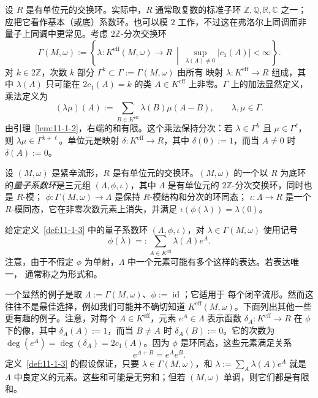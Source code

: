 设 $R$ 是有单位元的交换环。实际中，$R$ 通常取复数的标准子环
$\mathbb Z,\mathbb Q,\mathbb R,\mathbb C$ 之一；应把它看作基本（或底）系数环。也可以模
$2$ 工作，不过这在弗洛尔上同调而非量子上同调中更常见。考虑 $2\mathbb Z$-分次交换环
\[
  \Gamma(M,\omega):=
  \left\{\lambda:K^{\mathrm{eff}}(M,\omega)\to R\ \middle|\
  \sup_{\lambda(A)\ne0}|c_1(A)|<\infty\right\}.
\]
对 $k\in2\mathbb Z$，次数 $k$ 部分 $\Gamma^k\subset\Gamma:=\Gamma(M,\omega)$ 由所有
映射 $\lambda:K^{\mathrm{eff}}\to R$ 组成，其中 $\lambda(A)$ 只可能在
$2c_1(A)=k$ 的类 $A\in K^{\mathrm{eff}}$ 上非零。$\Gamma$ 上的加法显然定义，乘法定义为
\[
  (\lambda\mu)(A):=\sum_{B\in K^{\mathrm{eff}}}\lambda(B)\mu(A-B),
  \qquad \lambda,\mu\in\Gamma.
\]
由引理~\ref{lem:11-1-2}，右端的和有限。这个乘法保持分次：若
$\lambda\in\Gamma^k$ 且 $\mu\in\Gamma^\ell$，则
$\lambda\mu\in\Gamma^{k+\ell}$。单位元是映射 $\delta:K^{\mathrm{eff}}\to R$，其中
$\delta(0):=1$，而当 $A\ne0$ 时 $\delta(A):=0$。

\begin{definition}\label{def:11-1-3}
设 $(M,\omega)$ 是紧辛流形，$R$ 是有单位元的交换环。$(M,\omega)$ 的一个以 $R$ 为底环
的\emph{\BookRecordIndex{T0231}量子系数环}是三元组 $(\Lambda,\phi,\iota)$，其中 $\Lambda$ 是有单位元的
$2\mathbb Z$-分次交换环，同时也是 $R$-模；
$\phi:\Gamma(M,\omega)\to\Lambda$ 是保持 $R$-模结构和分次的环同态；
$\iota:\Lambda\to R$ 是一个 $R$-模同态，它在非零次数元素上消失，并满足
$\iota(\phi(\lambda))=\lambda(0)$。
\end{definition}

给定定义~\ref{def:11-1-3} 中的量子系数环 $(\Lambda,\phi,\iota)$，对
$\lambda\in\Gamma(M,\omega)$ 使用记号
\[
  \phi(\lambda)=:\sum_{A\in K^{\mathrm{eff}}}\lambda(A)e^A.
\]
注意，由于不假定 $\phi$ 为单射，$\Lambda$ 中一个元素可能有多个这样的表达。若表达唯一，
通常称之为形式和。

一个显然的例子是取 $\Lambda:=\Gamma(M,\omega)$、$\phi:=\operatorname{id}$；它适用于
每个闭\BookRecordIndex{T0358}辛流形。然而这往往不是最佳选择，例如我们可能并不确切知道
$K^{\mathrm{eff}}(M,\omega)$。下面列出其他一些更有趣的例子。注意，对每个
$A\in K^{\mathrm{eff}}$，元素 $e^A\in\Lambda$ 表示函数
$\delta_A:K^{\mathrm{eff}}\to R$ 在 $\phi$ 下的像，其中 $\delta_A(A):=1$，而当
$B\ne A$ 时 $\delta_A(B):=0$。它的次数为
$\deg(e^A)=\deg(\delta_A)=2c_1(A)$。因为 $\phi$ 是环同态，这些元素满足关系
\[
  e^{A+B}=e^Ae^B.
\]
定义~\ref{def:11-1-3} 的假设保证，只要 $\lambda\in\Gamma(M,\omega)$，和
$\lambda:=\sum_A\lambda(A)e^A$ 就是 $\Lambda$ 中良定义的元素。这些和可能是无穷和；但若
$(M,\omega)$ 单调，则它们都是有限和。

